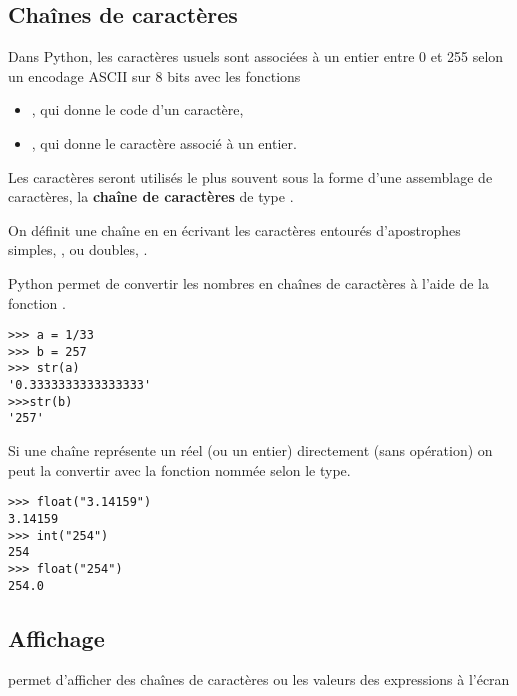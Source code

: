 \subsection{Chaînes de caractères}
Dans Python, les caractères usuels sont associées à un entier entre 0 et 255 selon un encodage ASCII sur 8 bits avec les fonctions 
\begin{itemize}
\item {}, qui donne le code d'un caractère,
\item {}, qui donne le caractère associé à un entier.
\end{itemize}Les caractères seront utilisés le plus souvent sous la forme d'une assemblage de caractères, la {\bf chaîne de caractères} de type .

\medskip

On définit une chaîne en en écrivant les caractères entourés d'apostrophes simples, , ou doubles, .

Python permet de convertir les nombres en chaînes de caractères à l'aide de la fonction .
\begin{lstlisting}
>>> a = 1/33
>>> b = 257
>>> str(a)
'0.3333333333333333'
>>>str(b)
'257'
\end{lstlisting}
Si une chaîne représente un réel (ou un entier) directement (sans opération) on peut la convertir avec la fonction nommée selon le type.
\begin{lstlisting}
>>> float("3.14159")
3.14159
>>> int("254")
254
>>> float("254")
254.0
\end{lstlisting}
\subsection{Affichage}
 permet d'afficher des chaînes de caractères ou les valeurs des expressions à l'écran

